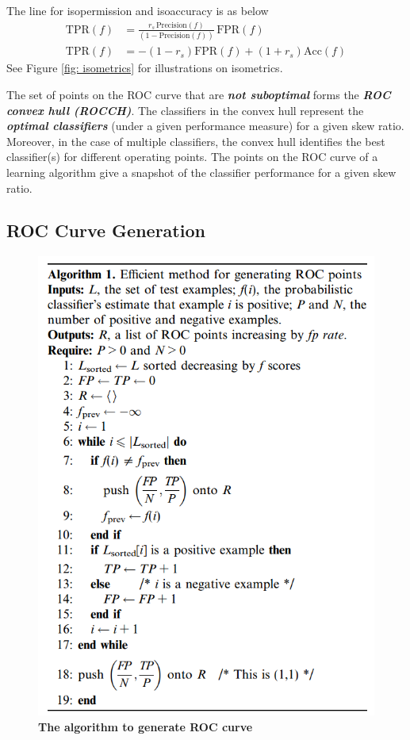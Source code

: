 \documentclass[11pt]{article}
\begin{document}
The line for isopermission and isoaccuracy is as below
\begin{align*}
 \text{TPR}(f) &= \frac{r_{s}\,\text{Precision}(f)}{(1-\text{Precision}(f)) }\,\text{FPR}(f) \\
 \text{TPR}(f) &= - (1 - r_s) \text{FPR}(f)  + (1 + r_s)\text{Acc}(f) 
\end{align*} See Figure \ref{fig: isometrics} for illustrations on isometrics.

The set of points on the ROC curve that are \emph{\textbf{not suboptimal}} forms the  \emph{\textbf{ROC convex hull (ROCCH)}}. The classifiers in
the convex hull represent the \emph{\textbf{optimal classifiers}} (under a given performance measure) for a given skew ratio. Moreover, in the case of multiple classifiers, the convex hull identifies the best classifier(s) for different operating points. The points on the ROC curve of a learning algorithm give a snapshot of the classifier performance for a given skew ratio. 


\subsection{ROC Curve Generation}
\begin{figure}
\begin{minipage}[t]{1\linewidth}
  \centering
  \centerline{\includegraphics[scale = 0.45]{roc_generation.png}}
\end{minipage}
\caption{\footnotesize{\textbf{The algorithm to generate ROC curve \citep{fawcett2006introduction}}}}
\label{fig: roc_generation}
\end{figure}
\end{document}
